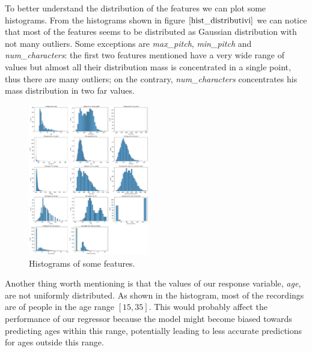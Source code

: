 To better understand the distribution of the features we can plot some histograms.
From the histograms shown in figure $\eqref{hist_distributivi}$ we can notice that most of the features seems to be distributed as Gaussian distribution with not many outliers. 
Some exceptions are \textit{max\_pitch}, \textit{min\_pitch} and \textit{num\_characters}: the first two features mentioned have a very wide range of values but almost all their distribution mass is concentrated in a single point, thus there are many outliers; on the contrary, \textit{num\_characters} concentrates his mass distribution in two far values.

\begin{figure}
    \includegraphics[width = 0.47\textwidth]{img/distribuzioni_features.png}
    \caption{Histograms of some features.}
    \label{hist_distributivi}
\end{figure}

Another thing worth mentioning is that the values of our response variable, \textit{age}, are not uniformly distributed. As shown in the histogram, most of the recordings are of people in the age range $[15,35]$. This would probably affect the performance of our regressor because the model might become biased towards predicting ages within this range, potentially leading to less accurate predictions for ages outside this range.